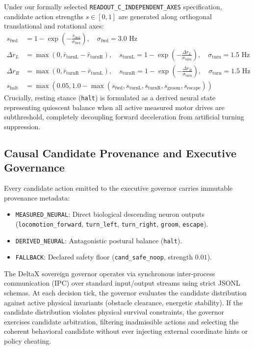 \documentclass[10pt,letterpaper]{article}
\begin{document}
Under our formally selected \texttt{READOUT\_C\_INDEPENDENT\_AXES} specification, candidate action strengths $s \in [0, 1]$ are generated along orthogonal translational and rotational axes:
\begin{align}
s_{\text{fwd}} &= 1 - \exp\left(-\frac{\bar{r}_{\text{fwd}}}{\sigma_{\text{fwd}}}\right), \quad \sigma_{\text{fwd}} = 3.0\text{ Hz} \\
\Delta r_L &= \max(0, \bar{r}_{\text{turnL}} - \bar{r}_{\text{turnR}}), \quad s_{\text{turnL}} = 1 - \exp\left(-\frac{\Delta r_L}{\sigma_{\text{turn}}}\right), \quad \sigma_{\text{turn}} = 1.5\text{ Hz} \\
\Delta r_R &= \max(0, \bar{r}_{\text{turnR}} - \bar{r}_{\text{turnL}}), \quad s_{\text{turnR}} = 1 - \exp\left(-\frac{\Delta r_R}{\sigma_{\text{turn}}}\right), \quad \sigma_{\text{turn}} = 1.5\text{ Hz} \\
s_{\text{halt}} &= \max\left(0.05, 1.0 - \max(s_{\text{fwd}}, s_{\text{turnL}}, s_{\text{turnR}}, s_{\text{groom}}, s_{\text{escape}})\right)
\end{align}
Crucially, resting stance (\texttt{halt}) is formulated as a derived neural state representing quiescent balance when all active measured motor drives are subthreshold, completely decoupling forward deceleration from artificial turning suppression.

\subsection{Causal Candidate Provenance and Executive Governance}

Every candidate action emitted to the executive governor carries immutable provenance metadata:
\begin{itemize}
    \item \texttt{MEASURED\_NEURAL}: Direct biological descending neuron outputs (\texttt{locomotion\_forward}, \texttt{turn\_left}, \texttt{turn\_right}, \texttt{groom}, \texttt{escape}).
    \item \texttt{DERIVED\_NEURAL}: Antagonistic postural balance (\texttt{halt}).
    \item \texttt{FALLBACK}: Declared safety floor (\texttt{cand\_safe\_noop}, strength $0.01$).
\end{itemize}

The DeltaX sovereign governor operates via synchronous inter-process communication (IPC) over standard input/output streams using strict JSONL schemas. At each decision tick, the governor evaluates the candidate distribution against active physical invariants (obstacle clearance, energetic stability). If the candidate distribution violates physical survival constraints, the governor exercises candidate arbitration, filtering inadmissible actions and selecting the coherent behavioral candidate without ever injecting external coordinate hints or policy cheating.
\end{document}
